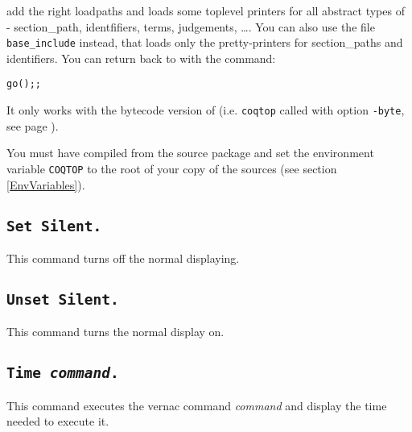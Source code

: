 \noindent add the right loadpaths and loads some toplevel printers for
all abstract types of \Coq - section\_path, identfifiers, terms, judgements,
\dots. You can also use the file \texttt{base\_include} instead,
that loads only the pretty-printers for section\_paths and
identifiers.
You can return back to \Coq{} with the command: 

\begin{flushleft}
\begin{verbatim}
go();;
\end{verbatim}
\end{flushleft}

\begin{Warnings}
\item It only works with the bytecode version of {\Coq} (i.e. {\tt coqtop} called with option {\tt -byte}, see page \pageref{binary-images}).
\item You must have compiled {\Coq} from the source package and set the
  environment variable \texttt{COQTOP} to the root of your copy of the sources (see section \ref{EnvVariables}).
\end{Warnings}

\subsection{\tt Set Silent.}
\label{Begin-Silent}
This command turns off the normal displaying.

\subsection{\tt Unset Silent.}
This command turns the normal display on.

\subsection{\tt Time \textrm{\textsl{command}}.}
\label{time}
This command executes the vernac command \textrm{\textsl{command}}
and display the time needed to execute it.





